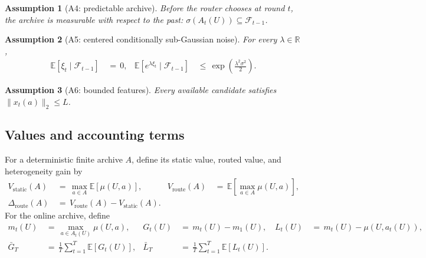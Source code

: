 \documentclass{article} %
\newtheorem{assumption}{Assumption}
\begin{document}
\begin{assumption}[A4: predictable archive]
\label{ass:app-predictable}
Before the router chooses at round \(t\), the archive is measurable with
respect to the past: \(\sigma(A_t(U))\subseteq\mathcal F_{t-1}\).
\end{assumption}

\begin{assumption}[A5: centered conditionally sub-Gaussian noise]
\label{ass:app-noise}
For every \(\lambda\in\mathbb R\),
\begin{equation}
\begin{aligned}
\mathbb E[\xi_t\mid\mathcal F_{t-1}] &\,=\,0, &
\mathbb E\!\left[e^{\lambda\xi_t}\mid\mathcal F_{t-1}\right]
&\,\leq\,\exp\!\left(\frac{\lambda^2\sigma^2}{2}\right).
\end{aligned}
\end{equation}
\end{assumption}

\begin{assumption}[A6: bounded features]
\label{ass:app-features}
Every available candidate satisfies \(\|x_t(a)\|_2\leq L\).
\end{assumption}

\subsection{Values and accounting terms}

For a deterministic finite archive \(A\), define its static value, routed
value, and heterogeneity gain by
\begin{equation}
\begin{aligned}
V_{\mathrm{static}}(A)
&\,=\,\max_{a\in A}\mathbb E[\mu(U,a)], &
V_{\mathrm{route}}(A)
&\,=\,\mathbb E\!\left[\max_{a\in A}\mu(U,a)\right], \\
\Delta_{\mathrm{route}}(A)
&\,=\,V_{\mathrm{route}}(A)-V_{\mathrm{static}}(A).
\end{aligned}
\end{equation}
For the online archive, define
\begin{equation}
\begin{aligned}
m_t(U)
&\,=\,\max_{a\in A_t(U)}\mu(U,a), &
G_t(U)
&\,=\,m_t(U)-m_1(U), &
L_t(U)
&\,=\,m_t(U)-\mu(U,a_t(U)), \\
\bar G_T
&\,=\,\frac1T\sum_{t=1}^T\mathbb E[G_t(U)], &
\bar L_T
&\,=\,\frac1T\sum_{t=1}^T\mathbb E[L_t(U)].
\end{aligned}
\end{equation}
\end{document}
